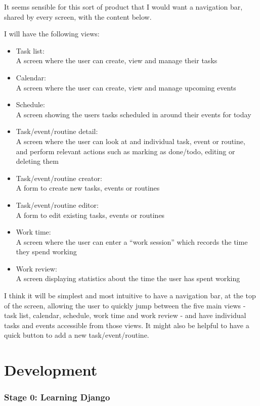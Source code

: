 \documentclass[]{article}
\begin{document}
It seems sensible for this sort of product that I would want a
navigation bar, shared by every screen, with the content below.

I will have the following views:

\begin{itemize}
\item
  Task list:\\
  A screen where the user can create, view and manage their tasks
\item
  Calendar:\\
  A screen where the user can create, view and manage upcoming events
\item
  Schedule:\\
  A screen showing the users tasks scheduled in around their events for
  today
\item
  Task/event/routine detail:\\
  A screen where the user can look at and individual task, event or
  routine, and perform relevant actions such as marking as done/todo,
  editing or deleting them
\item
  Task/event/routine creator:\\
  A form to create new tasks, events or routines
\item
  Task/event/routine editor:\\
  A form to edit existing tasks, events or routines
\item
  Work time:\\
  A screen where the user can enter a ``work session'' which records the
  time they spend working
\item
  Work review:\\
  A screen displaying statistics about the time the user has spent
  working
\end{itemize}

I think it will be simplest and most intuitive to have a navigation bar,
at the top of the screen, allowing the user to quickly jump between the
five main views - task list, calendar, schedule, work time and work
review - and have individual tasks and events accessible from those
views. It might also be helpful to have a quick button to add a new
task/event/routine.

\hypertarget{development}{%
\section{Development}\label{development}}

\hypertarget{stage-0-learning-django}{%
\subsubsection{Stage 0: Learning Django}\label{stage-0-learning-django}}
\end{document}
